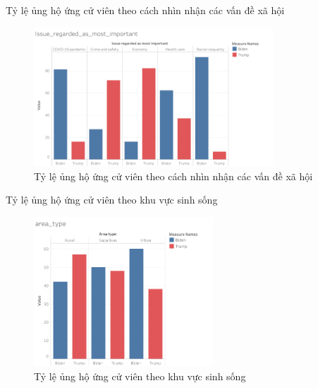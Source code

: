 \documentclass[10pt]{beamer}
\theoremstyle{remark}
\theoremstyle{definition}
\begin{document}
\begin{frame}{Tỷ lệ ủng hộ ứng cử viên theo cách nhìn nhận các vấn đề xã hội}
	\begin{figure}[h!]
        \centering
        \includegraphics[width=0.8\textwidth]{figures/Issue_regarded_as_most_important.png}
        \caption{Tỷ lệ ủng hộ ứng cử viên theo cách nhìn nhận các vấn đề xã hội}
    \end{figure}
\end{frame}

\begin{frame}{Tỷ lệ ủng hộ ứng cử viên theo khu vực sinh sống}
	\begin{figure}[h!]
        \centering
        \includegraphics[width=0.6\textwidth]{figures/area_type.png}
        \caption{Tỷ lệ ủng hộ ứng cử viên theo khu vực sinh sống}
    \end{figure}
\end{frame}
\end{document}

